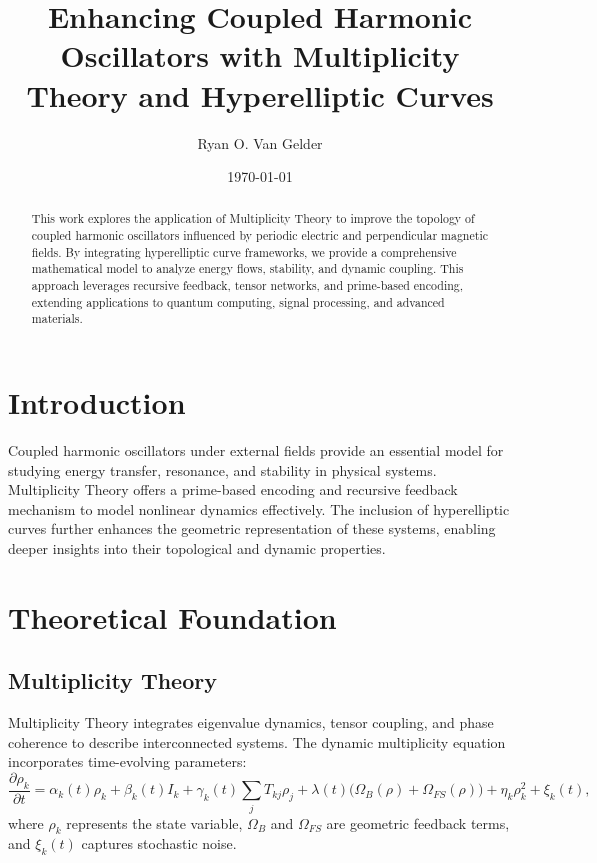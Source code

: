 \documentclass{article}
\theoremstyle{plain}
\begin{document}
\title{Enhancing Coupled Harmonic Oscillators with Multiplicity Theory and Hyperelliptic Curves}

\author{Ryan O. Van Gelder}
\date{\today}
\maketitle


\begin{abstract}
This work explores the application of Multiplicity Theory to improve the topology of coupled harmonic oscillators influenced by periodic electric and perpendicular magnetic fields. By integrating hyperelliptic curve frameworks, we provide a comprehensive mathematical model to analyze energy flows, stability, and dynamic coupling. This approach leverages recursive feedback, tensor networks, and prime-based encoding, extending applications to quantum computing, signal processing, and advanced materials.
\end{abstract}

\section{Introduction}
Coupled harmonic oscillators under external fields provide an essential model for studying energy transfer, resonance, and stability in physical systems. Multiplicity Theory offers a prime-based encoding and recursive feedback mechanism to model nonlinear dynamics effectively. The inclusion of hyperelliptic curves further enhances the geometric representation of these systems, enabling deeper insights into their topological and dynamic properties.

\section{Theoretical Foundation}

\subsection{Multiplicity Theory}
Multiplicity Theory integrates eigenvalue dynamics, tensor coupling, and phase coherence to describe interconnected systems. The dynamic multiplicity equation incorporates time-evolving parameters:\newline
\begin{equation}
\frac{\partial \rho_k}{\partial t} = \alpha_k(t) \rho_k + \beta_k(t) I_k + \gamma_k(t) \sum_j T_{kj} \rho_j + \lambda(t)\big(\Omega_B(\rho) + \Omega_{FS}(\rho)\big) + \eta_k \rho_k^2 + \xi_k(t),
\end{equation}
where $\rho_k$ represents the state variable, $\Omega_B$ and $\Omega_{FS}$ are geometric feedback terms, and $\xi_k(t)$ captures stochastic noise.
\end{document}
